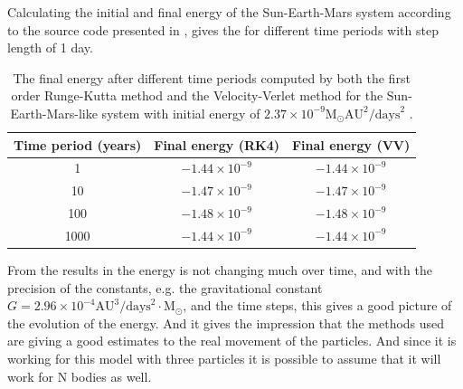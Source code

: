 Calculating the initial and final energy of the Sun-Earth-Mars system according to the source code presented in , gives the  for different time periods with step length of 1 day.

\begin{table}[H]
\centering
\caption{The final energy after different time periods computed by both the first order Runge-Kutta method and the Velocity-Verlet method for the Sun-Earth-Mars-like system with initial energy of $2.37\times 10^{-9} \text{M}_{\odot} \text{AU}^2 /\text{days}^2$ .
}
\begin{center}
\begin{tabular}{ | c | c | c |  }
  \hline	
  Time period (years) & Final energy (RK4) & Final energy (VV)
  \\ \hline		
  1  & $-1.44\times 10^{-9}$ & $-1.44\times 10^{-9}$
  \\ \hline
  10  & $-1.47\times 10^{-9}$ & $-1.47\times 10^{-9}$
  \\ \hline
  100  & $-1.48\times 10^{-9}$ & $-1.48\times 10^{-9}$
  \\ \hline
  1000 & $-1.44\times 10^{-9}$  & $-1.44\times 10^{-9}$ 
  \\ \hline
\end{tabular}
\end{center}
\label{tab:SunEarthMarsTest_energy_conservation}
\end{table}


From the results in  the energy is not changing much over time, and with the precision of the constants, e.g. the gravitational constant $G=2.96\times 10^{-4} \text{AU}^3 / \text{days}^2 \cdot \text{M}_{\odot}$, and the time steps, this gives a good picture of the evolution of the energy. And it gives the impression that the methods used are giving a good estimates to the real movement of the particles. And since it is working for this model with three particles it is possible to assume that it will work for N bodies as well. 